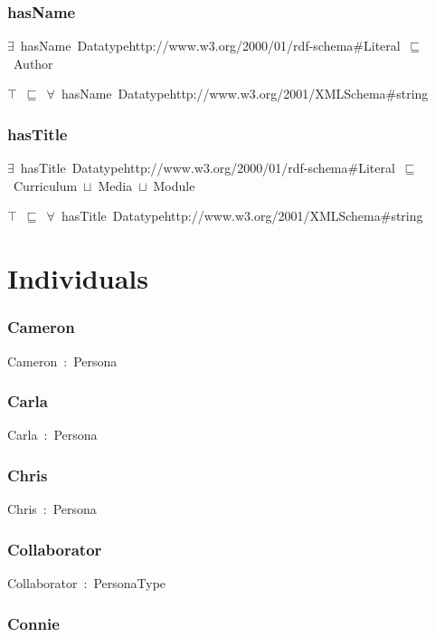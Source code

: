 \documentclass{article}
\begin{document}
\subsubsection*{hasName}

\ensuremath{\exists}~hasName~Datatypehttp://www.w3.org/2000/01/rdf-schema#Literal~\ensuremath{\sqsubseteq}~Author

\ensuremath{\top}~\ensuremath{\sqsubseteq}~\ensuremath{\forall}~hasName~Datatypehttp://www.w3.org/2001/XMLSchema#string

\subsubsection*{hasTitle}

\ensuremath{\exists}~hasTitle~Datatypehttp://www.w3.org/2000/01/rdf-schema#Literal~\ensuremath{\sqsubseteq}~Curriculum~\ensuremath{\sqcup}~Media~\ensuremath{\sqcup}~Module

\ensuremath{\top}~\ensuremath{\sqsubseteq}~\ensuremath{\forall}~hasTitle~Datatypehttp://www.w3.org/2001/XMLSchema#string

\section*{Individuals}\subsubsection*{Cameron}

Cameron~:~Persona

\subsubsection*{Carla}

Carla~:~Persona

\subsubsection*{Chris}

Chris~:~Persona

\subsubsection*{Collaborator}

Collaborator~:~PersonaType

\subsubsection*{Connie}
\end{document}
